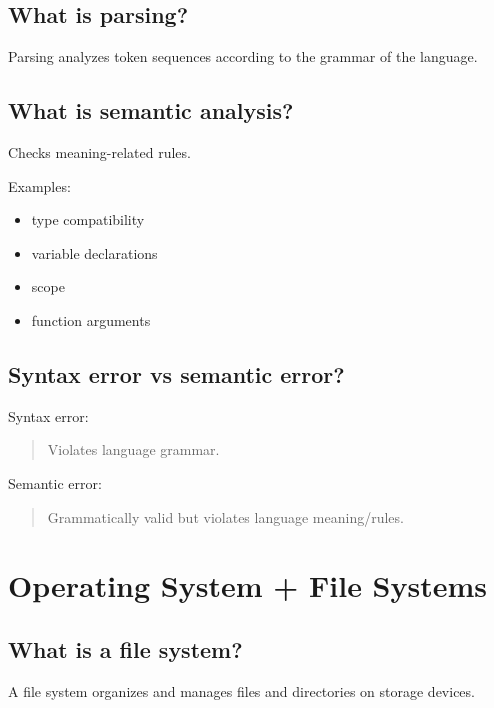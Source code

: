 \subsection{What is parsing?}

Parsing analyzes token sequences according to the grammar of the language.

\medskip

\subsection{What is semantic analysis?}

Checks meaning-related rules.

Examples:

\begin{itemize}
  \item type compatibility
  \item variable declarations
  \item scope
  \item function arguments
\end{itemize}

\medskip

\subsection{Syntax error vs semantic error?}

Syntax error:

\begin{quote}
Violates language grammar.\\
\end{quote}

Semantic error:

\begin{quote}
Grammatically valid but violates language meaning/rules.\\
\end{quote}

\medskip

\section{Operating System + File Systems}

\subsection{What is a file system?}

A file system organizes and manages files and directories on storage devices.


